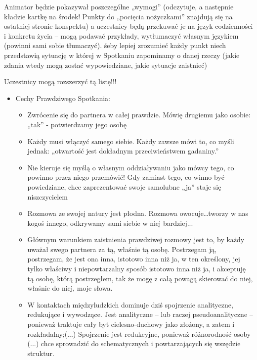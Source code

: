 \documentclass[a5paper,10pt,polish]{book}
\begin{document}
Animator będzie pokazywał poszczególne „wymogi” (odczytuje, a następnie kładzie kartkę na środek! Punkty do „pocięcia nożyczkami” znajdują się na ostatniej stronie konspektu) a uczestnicy będą przekuwać je na język codzienności i konkretu życia – mogą podawać przykłady, wytłumaczyć własnym językiem (powinni sami sobie tłumaczyć). śeby lepiej zrozumieć każdy punkt niech przedstawią sytuację w której w Spotkaniu zapominamy o danej rzeczy (jakie zdania wtedy mogą zostać wypowiedziane, jakie sytuacje zaistnieć)

Uczestnicy mogą rozszerzyć tą listę!!!
\begin{itemize}
\item {} 
Cechy Prawdziwego Spotkania:
\begin{itemize}
\item {} 
Zwrócenie się do partnera w całej prawdzie. Mówię drugiemu jako osobie: „tak” - potwierdzamy jego osobę

\item {} 
Każdy musi włączyć samego siebie. Każdy zawsze mówi to, co myśli jednak: „otwartość jest dokładnym przeciwieństwem gadaniny.”

\item {} 
Nie kieruje się myślą o własnym oddziaływaniu jako mówcy tego, co powinno przez niego przemówić! Gdy zamiast tego, co winno być powiedziane, chce zaprezentować swoje samolubne „ja” staje się niszczycielem

\item {} 
Rozmowa ze swojej natury jest płodna. Rozmowa owocuje…tworzy w nas kogoś innego, odkrywamy sami siebie w niej bardziej...

\item {} 
Głównym warunkiem zaistnienia prawdziwej rozmowy jest to, by każdy uważał swego partnera za tą, właśnie tą osobę. Postrzegam ją, postrzegam, że jest ona inna, istotowo inna niż ja, w ten określony, jej tylko właściwy i niepowtarzalny sposób istotowo inna niż ja, i akceptuję tą osobę, którą postrzegłem, tak że mogę z całą powagą skierować do niej, właśnie do niej, moje słowa.

\item {} 
W kontaktach międzyludzkich dominuje dziś spojrzenie analityczne, redukujące i wywodzące. Jest analityczne – lub raczej pseudoanalityczne – ponieważ traktuje cały byt cielesno-duchowy jako złożony, a zatem i rozkładalny;(...) Spojrzenie jest redukcyjne, ponieważ różnorodność osoby (...) chce sprowadzić do schematycznych i powtarzających się wszędzie struktur.

\end{itemize}

\end{itemize}
\end{document}
